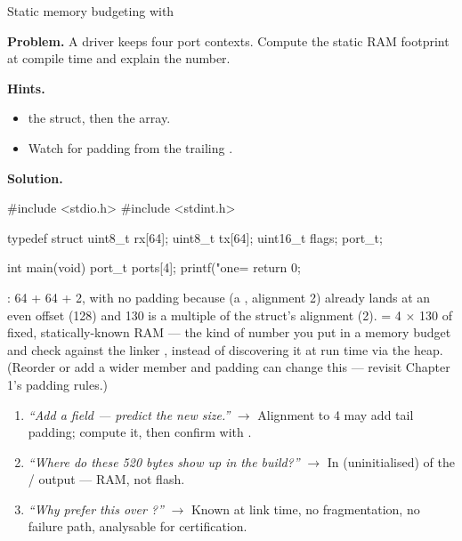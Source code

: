 \begin{gymproblem}{Static memory budgeting with }

\textbf{Problem.} A driver keeps four port contexts. Compute the static RAM
footprint at compile time and explain the number.

\textbf{Hints.}
\begin{itemize}
\item {} the struct, then the array.
\item Watch for padding from the trailing .
\end{itemize}

\attempt

\textbf{Solution.}
\begin{cgym}
#include <stdio.h>
#include <stdint.h>

typedef struct {
    uint8_t  rx[64];
    uint8_t  tx[64];
    uint16_t flags;
} port_t;

int main(void) {
    port_t ports[4];
    printf("one=%
    return 0;
}
\end{cgym}

: 64 + 64 + 2, with no padding because  (a
, alignment 2) already lands at an even offset (128) and 130 is
a multiple of the struct's alignment (2).  = 4 $\times$ 130 of
fixed, statically-known RAM --- the kind of number you put in a memory budget
and check against the linker , instead of discovering it at run time
via the heap. (Reorder or add a wider member and padding can change this ---
revisit Chapter 1's padding rules.)

\followups
\begin{enumerate}
\item \emph{``Add a  field --- predict the new size.''}
  $\rightarrow$ Alignment to 4 may add tail padding; compute it, then confirm
  with .
\item \emph{``Where do these 520 bytes show up in the build?''} $\rightarrow$
  In  (uninitialised) of the / output ---
  RAM, not flash.
\item \emph{``Why prefer this over ?''}
  $\rightarrow$ Known at link time, no fragmentation, no failure path,
  analysable for certification.
\end{enumerate}
\end{gymproblem}


